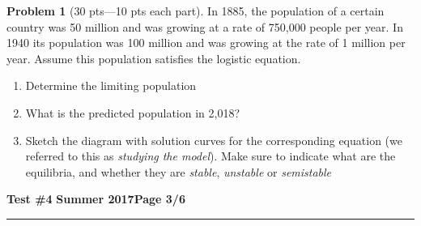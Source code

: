 \documentclass[12pt]{article}
\theoremstyle{definition}
\newtheorem{problem}{Problem}
\begin{document}
\bigskip
\begin{problem}[30 pts---10 pts each part]
In 1885, the population of a certain country was 50 million and was growing at a rate of 750,000 people per year.  In 1940 its population was 100 million and was growing at the rate of 1 million per year.  Assume this population satisfies the logistic equation.
\begin{enumerate}
  \item Determine the limiting population
  \vspace{4cm}
  \begin{flushright}
  \end{flushright}
  \item What is the predicted population in 2,018?
  \vspace{4cm}
  \begin{flushright}
  \end{flushright}
  \item Sketch the diagram with solution curves for the corresponding equation (we referred to this as \emph{studying the model}).  Make sure to indicate what are the equilibria, and whether they are \emph{stable}, \emph{unstable} or \emph{semistable}
\end{enumerate}
\end{problem} 

\newpage

\hfill{\large\bf Test \#4}\hfill{\large\bf
  Summer 2017}\hfill{\large\bf Page 3/6}\hrule
\end{document}
